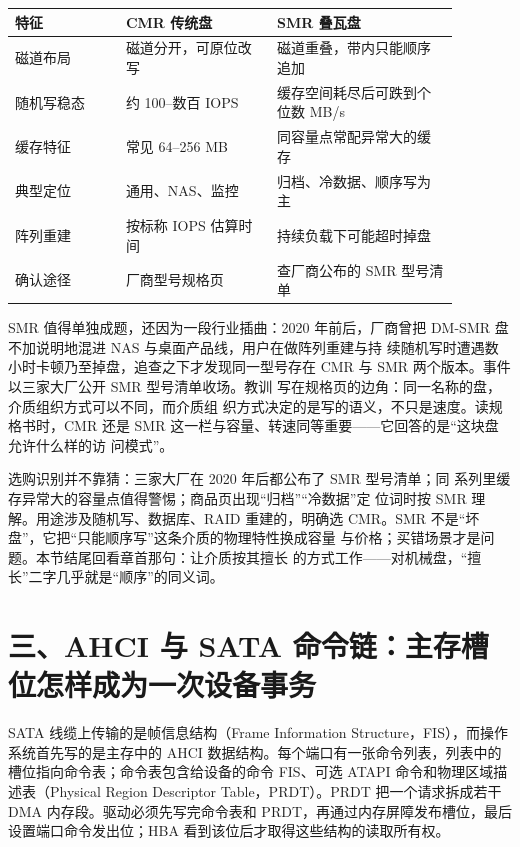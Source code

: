 \begin{longtable}{L{0.22\linewidth}L{0.30\linewidth}L{0.36\linewidth}}
\toprule
特征 & CMR 传统盘 & SMR 叠瓦盘 \\
\midrule
磁道布局 & 磁道分开，可原位改写 & 磁道重叠，带内只能顺序追加 \\\tablerowrule
随机写稳态 & 约 100--数百 IOPS & 缓存空间耗尽后可跌到个位数 MB/s \\\tablerowrule
缓存特征 & 常见 64--256 MB & 同容量点常配异常大的缓存 \\\tablerowrule
典型定位 & 通用、NAS、监控 & 归档、冷数据、顺序写为主 \\\tablerowrule
阵列重建 & 按标称 IOPS 估算时间 & 持续负载下可能超时掉盘 \\\tablerowrule
确认途径 & 厂商型号规格页 & 查厂商公布的 SMR 型号清单 \\
\bottomrule
\end{longtable}

SMR 值得单独成题，还因为一段行业插曲：2020 年前后，厂商曾把
DM-SMR 盘不加说明地混进 NAS 与桌面产品线，用户在做阵列重建与持
续随机写时遭遇数小时卡顿乃至掉盘，追查之下才发现同一型号存在
CMR 与 SMR 两个版本。事件以三家大厂公开 SMR 型号清单收场。教训
写在规格页的边角：同一名称的盘，介质组织方式可以不同，而介质组
织方式决定的是写的语义，不只是速度。读规格书时，CMR 还是 SMR
这一栏与容量、转速同等重要——它回答的是“这块盘允许什么样的访
问模式”。

选购识别并不靠猜：三家大厂在 2020 年后都公布了 SMR 型号清单；同
系列里缓存异常大的容量点值得警惕；商品页出现“归档”“冷数据”定
位词时按 SMR 理解。用途涉及随机写、数据库、RAID 重建的，明确选
CMR。SMR 不是“坏盘”，它把“只能顺序写”这条介质的物理特性换成容量
与价格；买错场景才是问题。本节结尾回看章首那句：让介质按其擅长
的方式工作——对机械盘，“擅长”二字几乎就是“顺序”的同义词。

\section{三、AHCI 与 SATA 命令链：主存槽位怎样成为一次设备事务}

SATA 线缆上传输的是帧信息结构（Frame Information Structure，FIS），而操作系统首先写的是主存中的 AHCI 数据结构。每个端口有一张命令列表，列表中的槽位指向命令表；命令表包含给设备的命令 FIS、可选 ATAPI 命令和物理区域描述表（Physical Region Descriptor Table，PRDT）。PRDT 把一个请求拆成若干 DMA 内存段。驱动必须先写完命令表和 PRDT，再通过内存屏障发布槽位，最后设置端口命令发出位；HBA 看到该位后才取得这些结构的读取所有权。


